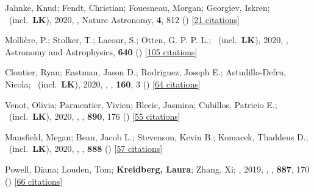 \item[{\color{numcolor}\scriptsize37}] Jahnke, Knud; Fendt, Christian; Fouesneau, Morgan; Georgiev, Iskren; \etal\ (incl.\ \textbf{LK}), 2020, , Nature Astronomy, \textbf{4}, 812 () [\href{https://ui.adsabs.harvard.edu/abs/2020NatAs...4..812J}{21 citations}]

\item[{\color{numcolor}\scriptsize36}] Molli{\`e}re, P.; Stolker, T.; Lacour, S.; Otten, G. P. P. L.; \etal\ (incl.\ \textbf{LK}), 2020, , Astronomy and Astrophysics, \textbf{640} () [\href{https://ui.adsabs.harvard.edu/abs/2020A&A...640A.131M}{105 citations}]

\item[{\color{numcolor}\scriptsize35}] Cloutier, Ryan; Eastman, Jason D.; Rodriguez, Joseph E.; Astudillo-Defru, Nicola; \etal\ (incl.\ \textbf{LK}), 2020, , \aj, \textbf{160}, 3 () [\href{https://ui.adsabs.harvard.edu/abs/2020AJ....160....3C}{64 citations}]

\item[{\color{numcolor}\scriptsize34}] Venot, Olivia; Parmentier, Vivien; Blecic, Jasmina; Cubillos, Patricio E.; \etal\ (incl.\ \textbf{LK}), 2020, , \apj, \textbf{890}, 176 () [\href{https://ui.adsabs.harvard.edu/abs/2020ApJ...890..176V}{55 citations}]

\item[{\color{numcolor}\scriptsize33}] Mansfield, Megan; Bean, Jacob L.; Stevenson, Kevin B.; Komacek, Thaddeus D.; \etal\ (incl.\ \textbf{LK}), 2020, , \apj, \textbf{888} () [\href{https://ui.adsabs.harvard.edu/abs/2020ApJ...888L..15M}{57 citations}]

\item[{\color{numcolor}\scriptsize32}] Powell, Diana; Louden, Tom; \textbf{Kreidberg, Laura}; Zhang, Xi; \etal, 2019, , \apj, \textbf{887}, 170 () [\href{https://ui.adsabs.harvard.edu/abs/2019ApJ...887..170P}{66 citations}]

